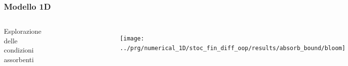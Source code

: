 \begin{frame}
  \frametitle{Modello 1D}
  \begin{columns}

    Esplorazione delle condizioni assorbenti
    \begin{figure}[!htb]
      \centering
      \includegraphics[width=\textwidth]{../img/huisman_lowvel_minimal_absorbing}
    \end{figure}

    \begin{figure}[!htb]
      \centering
      \texttt{[image: ../prg/numerical\_1D/stoc\_fin\_diff\_oop/results/absorb\_bound/bloom]}
    \end{figure}

  \end{columns}
\end{frame}



